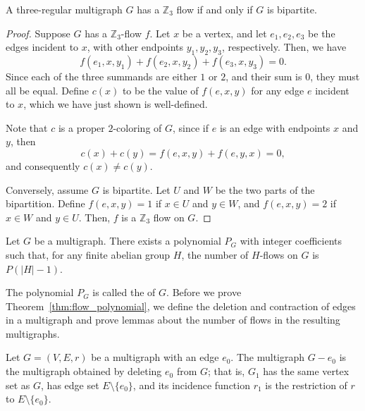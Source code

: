 \begin{proposition}
	A three-regular multigraph \(G\) has a \(\mathbb{Z}_3\) flow if and only if \(G\) is bipartite.
\end{proposition}

\begin{proof}
	Suppose \(G\) has a \(\mathbb{Z}_3\)-flow \(f\).
	Let \(x\) be a vertex, and let \(e_1, e_2, e_3\) be the edges incident to \(x\), with other endpoints \(y_1, y_2, y_3\), respectively.
	Then, we have
	\begin{equation}
		f(e_1, x, y_1) + f(e_2, x, y_2) + f(e_3, x, y_3) = 0.
	\end{equation}
	Since each of the three summands are either \(1\) or \(2\), and their sum is \(0\), they must all be equal.
	Define \(c(x)\) to be the value of \(f(e, x, y)\) for any edge \(e\) incident to \(x\), which we have just shown is well-defined.

	Note that \(c\) is a proper \(2\)-coloring of \(G\), since if \(e\) is an edge with endpoints \(x\) and \(y\), then
	\begin{equation}
		c(x) + c(y) = f(e, x, y) + f(e, y, x) = 0,
	\end{equation}
	and consequently \(c(x) \neq c(y)\).

	Conversely, assume \(G\) is bipartite.
	Let \(U\) and \(W\) be the two parts of the bipartition.
	Define \(f(e, x, y) = 1\) if \(x \in U\) and \(y \in W\),
	and \(f(e, x, y) = 2\) if \(x \in W\) and \(y \in U\).
	Then, \(f\) is a \(\mathbb{Z}_3\) flow on \(G\).
\end{proof}

\begin{theorem} \label{thm:flow_polynomial}
	Let \(G\) be a multigraph.
	There exists a polynomial \(P_G\)
	with integer coefficients such that,
	for any finite abelian group \(H\),
	the number of \(H\)-flows on \(G\) is \(P(|H| - 1)\).
\end{theorem}

The polynomial \(P_G\) is called the  of \(G\).
Before we prove Theorem~\ref{thm:flow_polynomial}, we define the deletion and contraction of edges in a multigraph and prove lemmas about the number of flows in the resulting multigraphs.

\begin{definition}[Deletion]
	Let \(G = (V, E, r)\) be a multigraph with an edge \(e_0\).
	The multigraph \(G - e_0\) is the multigraph obtained by deleting \(e_0\) from \(G\);
	that is,
	\(G_1\) has the same vertex set as \(G\),
	has edge set \(E \setminus \{e_0\}\),
	and its incidence function \(r_1\) is the restriction of \(r\) to \(E \setminus \{e_0\}\).
\end{definition}

